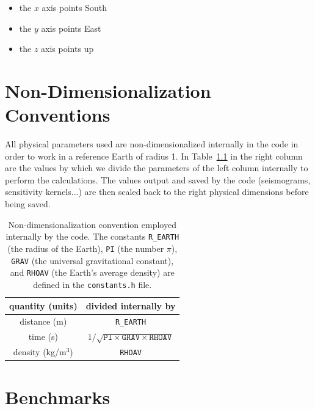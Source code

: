 \documentclass[oneside,english]{book}
\providecommand{\tabularnewline}{\\}
\begin{document}
\begin{itemize}
\item the $x$ axis points South
\item the $y$ axis points East
\item the $z$ axis points up
\end{itemize}

\chapter{\label{cha:Non-Dimensionalization-Conventions}Non-Dimensionalization
Conventions{\small{} }}

All physical parameters used are non-dimensionalized internally in the code
in order to work in a reference Earth of radius 1. In Table~{\small \ref{table:conventions} in the right column are the values by which
we divide the parameters of the left column internally to perform the calculations.
The values output and saved by the code (seismograms, sensitivity kernels...) are then
scaled back to the right physical dimensions before being saved.
}%
\begin{table}[ht]
\noindent \begin{centering}
{\small }\begin{tabular}{|c|c|}
\hline
quantity (units)  & divided internally by \tabularnewline
\hline
distance (m)  & \texttt{R\_EARTH} \tabularnewline
time (s)  & $1/\sqrt{\texttt{PI}\times\texttt{GRAV}\times\texttt{RHOAV}}$ \tabularnewline
density (kg/m$^{3}$)  & \texttt{RHOAV} \tabularnewline
\hline
\end{tabular}
\par\end{centering}{\small \par}

\caption{Non-dimensionalization convention employed internally by the code. The constants \texttt{R\_EARTH}
(the radius of the Earth), \texttt{PI} (the number $\pi$), \texttt{GRAV}
(the universal gravitational constant), and \texttt{RHOAV} (the Earth's
average density) are defined in the \texttt{constants.h} file. }


{\small \label{table:conventions} }
\end{table}
{\small \par}


\chapter{Benchmarks}
\end{document}
